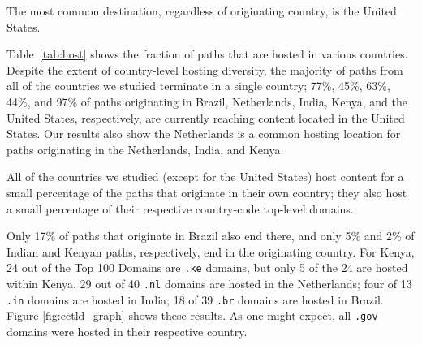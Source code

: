 \begin{finding}
The most common destination, regardless of originating country, is the United States.
\end{finding}
\noindent
Table~\ref{tab:host} shows the fraction of paths that are hosted in various
countries.  Despite the extent of country-level hosting diversity, the
majority of paths from all of the countries we studied terminate in a single
country; 77\%, 45\%, 63\%, 44\%, and 97\% of paths originating in Brazil, Netherlands, India,
Kenya, and the United States, respectively, are currently reaching content located in the
United States.   Our results also
show the Netherlands is a common hosting location for paths originating in the
Netherlands, India, and Kenya.



\begin{finding}
All of the countries we studied (except for the United States) host content for a small percentage of the paths that originate in their own country; they also host a small percentage of their respective country-code top-level domains.
\end{finding}
\noindent
Only 17\% of paths that originate in Brazil also end there, and only 5\%
and 2\% of Indian and Kenyan paths, respectively, end in the originating
country.  
For Kenya, 24 out of the Top 100 Domains are {\tt .ke} domains, but only 5
of the 24 are hosted within Kenya.  29 out of 40 {\tt .nl} domains are hosted in the Netherlands;
four of 13 {\tt .in} domains are hosted in India; 18 of 39 {\tt .br} domains are hosted in Brazil.  
Figure \ref{fig:cctld_graph} shows these results.  As one might expect, all {\tt .gov} domains were hosted in their respective country. 

